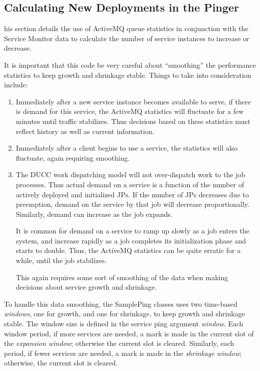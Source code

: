     \subsection{Calculating New Deployments in the Pinger}
    \label{subsec:services.calculate-new}

    his section details the use of ActiveMQ queue statistics
    in conjunction with the Service Monitor data to calculate the number
    of service instances to increase or decrease.

    It is important that this code be very careful about ``smoothing'' the
    performance statistics to keep growth and shrinkage stable.  Things
    to take into consideration include:
    \begin{enumerate}
      \item Immediately after a new service instance becomes available to
        serve, if there is demand for this service, the ActiveMQ statistics
        will fluctuate for a few minutes until traffic stabilizes.  Thus
        decisions based on these statistics must reflect history as well as
        current information.

      \item Immediately after a client begins to use a service, the statistics
        will also fluctuate, again requiring smoothing.

      \item The DUCC work dispatching model will not over-dispatch work to the
        job processes.  Thus actual demand on a service is a function of the
        number of actively deployed and initialized JPs.  If the number of
        JPs decreases due to preemption, demand on the service by that job
        will decrease proportionally.  Similarly, demand can increase as the
        job expands.  

        It is common for demand on a service to ramp up slowly as
        a job enters the system, and increase rapidly as a job completes its
        initialization phase and starts to double.  Thus, the ActiveMQ statistics
        can be quite erratic for a while, until the job stabilizes.

        This again requires some sort of smoothing of the data when making
        decisions about service growth and shrinkage.
    \end{enumerate}
    
    To handle this data smoothing, the SamplePing classes uses two time-based {\em windows}, one for
    growth, and one for shrinkage, to keep growth and shrinkage stable.  The window size is defined
    in the service ping argument {\em window}.
    Each window period, if more
    services are needed, a mark is made in the current slot of the {\em expansion window}; otherwise
    the current slot is cleared.  Similarly, each period, if fewer services are needed, a mark is
    made in the {\em shrinkage window}; otherwise, the current slot is cleared.

